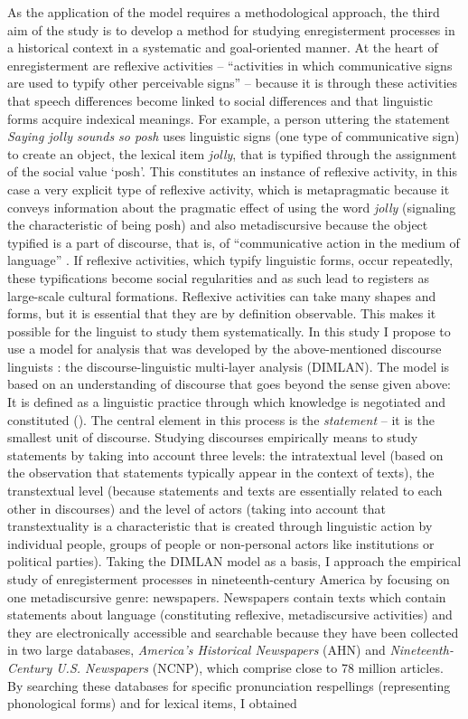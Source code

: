 As the application of the model requires a methodological approach, the third aim of the study is to develop a method for studying enregisterment processes in a historical context in a systematic and goal-oriented manner. At the heart of enregisterment are reflexive activities – “activities in which communicative signs are used to typify other perceivable signs” \citep[16]{Agha2007} – because it is through these activities that speech differences become linked to social differences and that linguistic forms acquire indexical meanings. For example, a person uttering the statement \emph{Saying jolly sounds so posh} uses linguistic signs (one type of communicative sign) to create an object, the lexical item \emph{jolly}, that is typified through the assignment of the social value ‘posh’. This constitutes an instance of reflexive activity, in this case a very explicit type of reflexive activity, which is metapragmatic because it conveys information about the pragmatic effect of using the word \emph{jolly} (signaling the characteristic of being posh) and also metadiscursive because the object typified is a part of discourse, that is, of “communicative action in the medium of language” \citep[2]{Johnstone2018}. If reflexive activities, which typify linguistic forms, occur repeatedly, these typifications become social regularities and as such lead to registers as large-scale cultural formations. Reflexive activities can take many shapes and forms, but it is essential that they are by definition observable. This makes it possible for the linguist to study them systematically. In this study I propose to use a model for analysis that was developed by the above-mentioned discourse linguists \citet{Spitzmuller2011}: the discourse-linguistic multi-layer analysis (DIMLAN). The model is based on an understanding of discourse that goes beyond the sense given above: It is defined as a linguistic practice through which knowledge is negotiated and constituted (\citealt[53]{Spitzmuller2011}). The central element in this process is the \textit{statement} – it is the smallest unit of discourse. Studying discourses empirically means to study statements by taking into account three levels: the intratextual level (based on the observation that statements typically appear in the context of texts), the transtextual level (because statements and texts are essentially related to each other in discourses) and the level of actors (taking into account that transtextuality is a characteristic that is created through linguistic action by individual people, groups of people or non-personal actors like institutions or political parties). Taking the DIMLAN model as a basis, I approach the empirical study of enregisterment processes in nineteenth-century America by focusing on one metadiscursive genre: newspapers. Newspapers contain texts which contain statements about language (constituting reflexive, metadiscursive activities) and they are electronically accessible and searchable because they have been collected in two large databases, \emph{America’s Historical Newspapers} (AHN) and \emph{Nineteenth-Century U.S. Newspapers} (NCNP), which comprise close to 78 million articles. By searching these databases for specific pronunciation respellings (representing phonological forms) and for lexical items, I obtained 